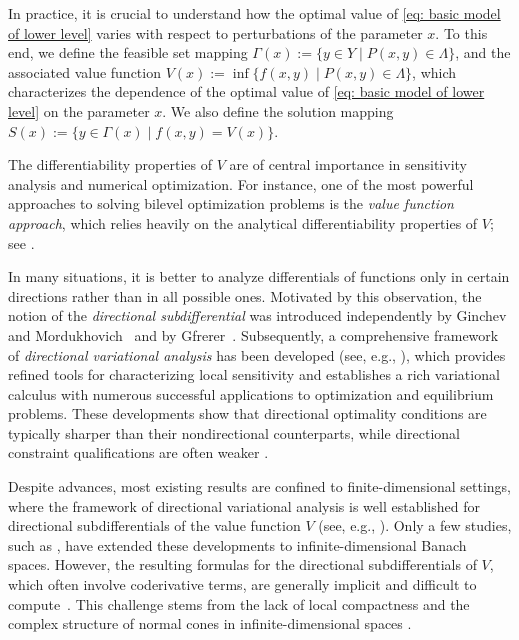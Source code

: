 \documentclass[12pt,twoside,reqno]{amsart}
\theoremstyle{definition}
\numberwithin{equation}{section}
\begin{document}
In practice, it is crucial to understand how the optimal value of \eqref{eq: basic model of lower level} varies with respect to perturbations of the parameter $x$. 
To this end, we define the feasible set mapping $\Gamma(x):=\{y \in Y \mid P(x,y)\in \Lambda \}$, 
and the associated value function $V(x):=\inf\{f(x,y)\mid P(x,y)\in\Lambda\}$,  
which characterizes the dependence of the optimal value of \eqref{eq: basic model of lower level} on the parameter $x$. 
We also define the solution mapping $S(x):=\{y\in \Gamma(x)\mid f(x,y)=V(x)\}$. 

The differentiability properties of $V$ are of central importance in sensitivity analysis and numerical optimization. 
For instance, one of the most powerful approaches to solving bilevel optimization problems is the \emph{value function approach}, which relies heavily on the analytical differentiability properties of $V$; see \cite{Ye1995,Ye2010}.  

In many situations, it is better to analyze differentials of functions only in certain directions rather than in all possible ones. Motivated by this observation, the notion of the \emph{directional subdifferential} was introduced independently by Ginchev and Mordukhovich~\cite{ginchev2011directionally} and by Gfrerer~\cite{gfrerer2013directional}. Subsequently, a comprehensive framework of \emph{directional variational analysis} has been developed (see, e.g., \cite{Ginchev2012directional,gfrerer2013directional,long2017calculus,long2017calculusb}), which provides refined tools for characterizing local sensitivity and establishes a rich variational calculus with numerous successful applications to optimization and equilibrium problems. These developments show that directional optimality conditions are typically sharper than their nondirectional counterparts, while directional constraint qualifications are often weaker \cite{gfrerer2013directional,bai2022directional}.

Despite advances, most existing results are confined to finite-dimensional settings, where the framework of directional variational analysis is well established for directional subdifferentials of the value function $V$ (see, e.g., \cite{benko2019calculus,bai2022directional,Bai2023Directional}). 
Only a few studies, such as \cite{gfrerer2013directional,long2017calculus,long2017calculusb}, have extended these developments to infinite-dimensional Banach spaces. 
However, the resulting formulas for the directional subdifferentials of $V$, which often involve coderivative terms, are generally implicit and difficult to compute~\cite{long2017calculus}. 
This challenge stems from the lack of local compactness and the complex structure of normal cones in infinite-dimensional spaces \cite{gfrerer2013directional}.  
\end{document}
